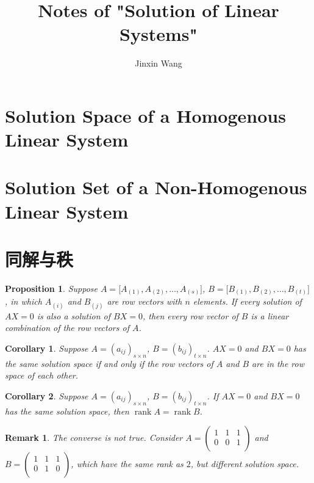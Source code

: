 \documentclass[onecolumn]{ctexart}
\title{Notes of "Solution of Linear Systems"}
\author{Jinxin Wang}
\date{}
\newtheorem{proposition}{Proposition}
\newtheorem{corollary}{Corollary}
\newtheorem{remark}{Remark}
\DeclareMathOperator{\rank}{rank}
\begin{document}
\maketitle

\section{Solution Space of a Homogenous Linear System}

\section{Solution Set of a Non-Homogenous Linear System}

\section{同解与秩}

\begin{proposition}
  Suppose $A = \lbrack A_{(1)}, A_{(2)}, \ldots, A_{(s)}\rbrack$, $B = \lbrack 
  B_{(1)}, B_{(2)}, \ldots, B_{(t)}\rbrack$, in which $A_{(i)}$ and $B_{(j)}$ 
  are row vectors with $n$ elements. If every solution of $AX = 0$ is also a 
  solution of $BX = 0$, then every row vector of $B$ is a linear combination of 
  the row vectors of $A$.
\end{proposition}

\begin{corollary}
  Suppose $A = (a_{ij})_{s \times n}$, $B = (b_{ij})_{t \times n}$. $AX = 0$ and 
  $BX = 0$ has the same solution space if and only if the row vectors of $A$ and 
  $B$ are in the row space of each other.
\end{corollary}

\begin{corollary}
  Suppose $A = (a_{ij})_{s \times n}$, $B = (b_{ij})_{t \times n}$. If $AX = 0$ 
  and $BX = 0$ has the same solution space, then $\rank A = \rank B$.
\end{corollary}
\begin{remark}
  The converse is not true. Consider $A = 
  \begin{pmatrix}
    1 & 1 & 1 \\
    0 & 0 & 1 \\
  \end{pmatrix}$ and $B = 
  \begin{pmatrix}
    1 & 1 & 1 \\
    0 & 1 & 0 \\
  \end{pmatrix}$, which have the same rank as $2$, but different solution space.
\end{remark}
\end{document}
